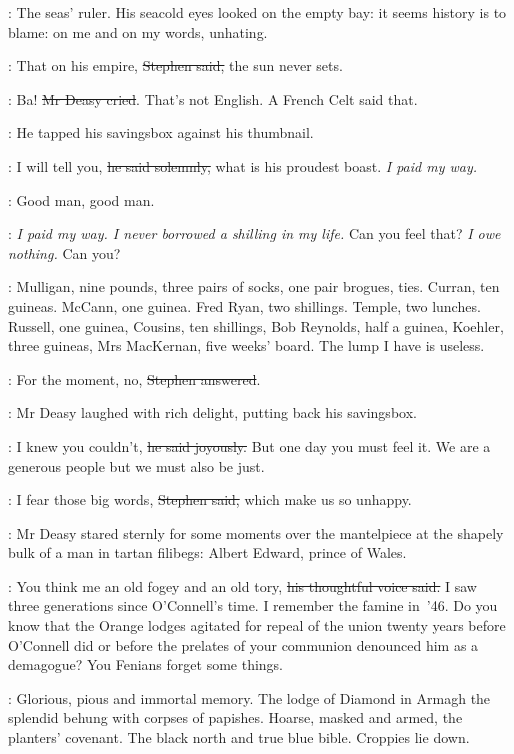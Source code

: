 \StephenInt:
The seas' ruler.
His seacold eyes looked on the empty bay:
it seems history is to blame:
on me and on my words, unhating.

\Stephen:
That on his empire, \sout{Stephen said,} the sun never sets.

\deasy:
Ba! \sout{Mr Deasy cried}.
That's not English.
A French Celt said that.

:
He tapped his savingsbox against his thumbnail.

\deasy:
I will tell you, \sout{he said solemnly,} what is his proudest boast.
\emph{I paid my way.}

\StephenInt:
Good man, good man.

\deasy:
\emph{I paid my way.
I never borrowed a shilling in my life.}
Can you feel that?
\emph{I owe nothing.}
Can you?

\StephenInt:
Mulligan, nine pounds, three pairs of socks, one pair brogues, ties.
Curran, ten guineas.
McCann, one guinea.
Fred Ryan, two shillings.
Temple, two lunches.
Russell, one guinea,
Cousins, ten shillings,
Bob Reynolds, half a guinea,
Koehler, three guineas,
Mrs MacKernan, five weeks' board.
The lump I have is useless.

\Stephen:
For the moment, no,
\sout{Stephen answered}.

:
Mr Deasy laughed with rich delight, putting back his savingsbox.

\deasy:
I knew you couldn't, \sout{he said joyously.}
But one day you must feel it.
We are a generous people but we must also be just.

\Stephen:
I fear those big words, \sout{Stephen said,}
which make us so unhappy.

:
Mr Deasy stared sternly for some moments over the mantelpiece
at the shapely bulk of a man in tartan filibegs:
Albert Edward, prince of Wales.

\deasy:
You think me an old fogey and an old tory, \sout{his thoughtful voice said.}
I saw three generations since O'Connell's time.
I remember the famine in~'46.
Do you know that the Orange lodges agitated for repeal of the union
twenty years before O'Connell did
or before the prelates of your communion denounced him as a demagogue?
You Fenians forget some things.

\StephenInt:
Glorious, pious and immortal memory.
The lodge of Diamond in Armagh
the splendid behung with corpses of papishes.
Hoarse, masked and armed, the planters' covenant.
The black north and true blue bible.
Croppies lie down.

